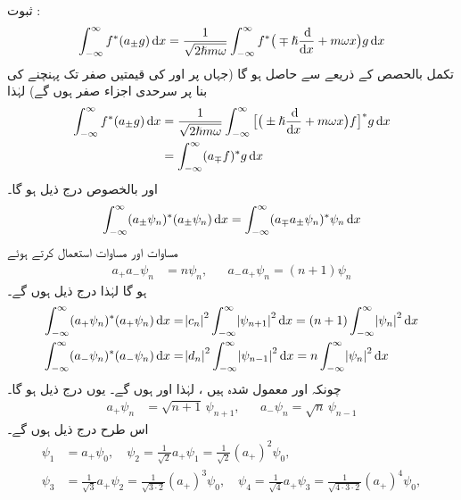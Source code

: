ثبوت :
\begin{align*}
\int_{ - \infty}^{ \infty } f^*( a_{\pm}g ) \dif x = \frac{1}{ \sqrt{ 2 \hslash m \omega } } \int_{ - \infty }^{ \infty } f^*\big( \mp \hslash \frac{\dif}{\dif x} + m \omega x \big) g \dif x
\end{align*} 
تکمل بالحصص کے ذریعے 
 سے  حاصل ہو گا (جہاں  پر  اور  کی قیمتیں صفر تک پہنچنے کی بنا پر سرحدی اجزاء صفر ہوں گے) لہٰذا 
\begin{align*}
\int_{ - \infty }^{ \infty } f^*( a_{\pm} g) \dif x &= \frac{1}{ \sqrt{ 2 \hslash m \omega } } \int_{ - \infty }^{ \infty } \big[ \big( \pm \hslash \frac{\dif}{\dif x} + m \omega x \big) f\big]^* g \dif x \\
&= \int_{ - \infty }^{ \infty } (a_\mp f )^* g \dif x
\end{align*} 
اور بالخصوص درج ذیل ہو گا۔
\begin{align*}
\int_{ - \infty }^{ \infty } ( a_\pm \psi_n )^*( a_\pm \psi_n ) \dif x = \int_{ - \infty }^{ \infty } ( a_\mp a_\pm \psi_n )^* \psi_n \dif x
\end{align*}
 مساوات  اور مساوات  استعمال کرتے ہوئے 
\begin{align}\label{مساوات_شروڈنگر_سیڑھی_رفعت_تقلیل}
a_+ a_- \psi_n &= n \psi_n , && a_- a_+ \psi_n = ( n+1 ) \psi_n 
\end{align}
ہو گا لہٰذا درج ذیل ہوں گے۔ 
\begin{align*}
\int_{ - \infty }^{ \infty } ( a_+ \psi_n )^*( a_+ \psi_n ) \dif x &= \abs{c_n }^2 \int_{ - \infty }^{ \infty } \abs{ \psi_{n+1} }^2 \dif x = ( n+1 ) \int_{ - \infty }^{ \infty } \abs{ \psi_n }^2 \dif x
\\
\int_{ - \infty }^{ \infty } ( a_- \psi_n )^*( a_- \psi_n ) \dif x &= \abs{ d_n }^2 \int_{ - \infty }^{ \infty } \abs{ \psi_{n-1} }^2 \dif x = n \int_{ - \infty }^{ \infty } \abs{ \psi_n }^2 \dif x
\end{align*}
چونکہ  اور  معمول شدہ ہیں ، لہٰذا  اور
 ہوں گے۔ یوں درج ذیل ہو گا۔
\begin{align}
a_+ \psi_n &= \sqrt{n+1} \,\psi_{n+1} ,&& a_- \psi_n = \sqrt{n} \,\psi_{n-1}
\end{align}
اس طرح درج ذیل ہوں گے۔
\begin{align*}
\psi_1 &= a_+ \psi_0 , \quad \psi_2 =\frac{1}{\sqrt{2}} a_+ \psi_1 = \frac{1}{ \sqrt{ 2 } } (a_+)^2 \psi_0,
\\
\psi_3 &= \frac{ 1 }{ \sqrt{ 3 } } a_+ \psi_2 = \frac{ 1 }{ \sqrt{3 \cdot 2} } ( a_+ )^3 \psi_0 ,\quad \psi_4 = \frac{1}{ \sqrt{4} } a_+ \psi_3 =\frac{1}{ \sqrt{4 \cdot 3 \cdot 2} } ( a_+)^4 \psi_0,
\end{align*}

